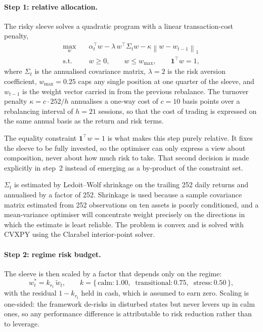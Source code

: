 \documentclass{singlecol-new}
\theoremstyle{TH}{
\newtheorem{lemma}{Lemma}
\newtheorem{theorem}[lemma]{Theorem}
\newtheorem{corrolary}[lemma]{Corrolary}
\newtheorem{conjecture}[lemma]{Conjecture}
\newtheorem{proposition}[lemma]{Proposition}
\newtheorem{claim}[lemma]{Claim}
\newtheorem{stheorem}[lemma]{Wrong Theorem}
\newtheorem{algorithm}{Algorithm}
}
\theoremstyle{THrm}{
\newtheorem{definition}{Definition}[section]
\newtheorem{question}{Question}[section]
\newtheorem{remark}{Remark}
\newtheorem{scheme}{Scheme}
}
\theoremstyle{THhit}{
\newtheorem{case}{Case}[section]
}
\begin{document}
\paragraph{Step 1: relative allocation.} The risky sleeve solves a quadratic program
with a linear transaction-cost penalty,
\begin{align}
\max_{w} \quad & \alpha_t^{\top} w - \lambda \, w^{\top} \Sigma_t w
- \kappa \left\| w - w_{t-1} \right\|_1 \\
\text{s.t.} \quad & w \geq 0, \qquad w \leq w_{\max}, \qquad \mathbf{1}^{\top} w = 1,
\end{align}
where $\Sigma_t$ is the annualised covariance matrix, $\lambda = 2$ is the risk
aversion coefficient, $w_{\max} = 0.25$ caps any single position at one quarter of the
sleeve, and $w_{t-1}$ is the weight vector carried in from the previous rebalance. The
turnover penalty $\kappa = c \cdot 252 / h$ annualises a one-way cost of $c = 10$ basis
points over a rebalancing interval of $h = 21$ sessions, so that the cost of trading is
expressed on the same annual basis as the return and risk terms.

The equality constraint $\mathbf{1}^{\top} w = 1$ is what makes this step purely
relative. It fixes the sleeve to be fully invested, so the optimiser can only express a
view about composition, never about how much risk to take. That second decision is made
explicitly in step~2 instead of emerging as a by-product of the constraint set.

$\Sigma_t$ is estimated by Ledoit--Wolf shrinkage \citep{ledoit04} on the trailing 252
daily returns and annualised by a factor of 252. Shrinkage is used because a sample
covariance matrix estimated from 252 observations on ten assets is poorly conditioned,
and a mean-variance optimiser will concentrate weight precisely on the directions in
which the estimate is least reliable. The problem is convex and is solved with CVXPY
using the Clarabel interior-point solver.

\paragraph{Step 2: regime risk budget.} The sleeve is then scaled by a factor that
depends only on the regime:
\begin{equation}
w^{\ast}_t = k_{r_t} \, \tilde{w}_t, \qquad
k = \{\,\text{calm}: 1.00, \;\; \text{transitional}: 0.75, \;\; \text{stress}: 0.50\,\},
\label{eq:budget}
\end{equation}
with the residual $1 - k_{r_t}$ held in cash, which is assumed to earn zero. Scaling is
one-sided: the framework de-risks in disturbed states but never levers up in calm ones,
so any performance difference is attributable to risk reduction rather than to leverage.
\end{document}
